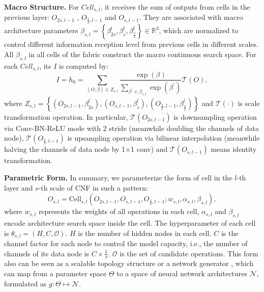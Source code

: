 \documentclass[journal]{IEEEtran}
\begin{document}
\textbf{Macro Structure.} For $Cell_{s,l}$, it receives the sum of outputs from cells in the previous layer: $O_{2s,l-1}$ , $O_{\frac{s}{2},l-1}$ and $O_{s,l-1}$. They are associated with macro architecture parameters $\beta_{s,l}=\left\{\beta_{2s}^l,\beta_{s}^l,\beta_{\frac{s}{2}}^l\right\}\in \mathbb{R}^3$, which are normalized to control different information reception level from previous cells in different scales. All $\beta_{s,l}$ in all cells of the fabric construct the macro continuous search space. For each $Cell_{s,l}$, its $I$ is computed by:
\begin{equation}
I=h_0=\sum_{(O,\beta)\in Z_{s,l} }\frac{\exp \left(\beta\right)}{\sum_{\beta^{\prime} \in \beta_{s,l}} \exp \left(\beta^{\prime}\right)} \mathcal{T}(O),
\end{equation}
where $Z_{s,l}=\left\{(O_{2s,l-1},\beta_{2s}^l),(O_{s,l-1},\beta_{s}^l),(O_{\frac{s}{2},l-1},\beta_{\frac{s}{2}}^l)\right\}$ and $\mathcal{T}(\cdot)$ is scale transformation operation. In particular, $\mathcal{T}(O_{2s,l-1})$ is downsampling operation via Conv-BN-ReLU mode with 2 stride (meanwhile doubling the channels of data node), $\mathcal{T}(O_{\frac{s}{2},l-1})$ is upsampling operation via bilinear interpolation (meanwhile halving the channels of data node by 1$\times$1 conv) and $\mathcal{T}(O_{s,l-1})$ means identity transformation. 



\textbf{Parametric Form.} In summary, we parameterize the form of cell in the $l$-th layer and $s$-th scale of CNF in such a pattern:
\begin{equation}
O_{s,l} =\mbox{Cell}_{s,l }\left(O_{2s,l-1},O_{s,l-1},O_{\frac{s}{2},l-1};w_{s,l},\alpha_{s,l},\beta_{s,l}\right),
\label{con}
\end{equation}
where $w_{s,l}$ represents the weights of all operations in each cell, $\alpha_{s,l}$ and $\beta_{s,l}$ encode architecture search space inside the cell. The hyperparameter of each cell is $\theta_{s,l}=\left(H,C,\mathcal{O}\right)$. $H$ is the number of hidden nodes in each cell. $C$ is the channel factor for each node to control the model capacity, i.e., the number of channels of its data node is $C\times\frac{1}{s}$. $\mathcal{O}$ is the set of candidate operations. This form also can be seen as a scalable topology structure or a network generator \cite{Xie_2019_ICCV}, which can map from a parameter space $ \Theta $ to a space of neural network architectures $\mathcal{N}$, formulated as $g:\Theta \longmapsto\mathcal{N}$.
\end{document}
